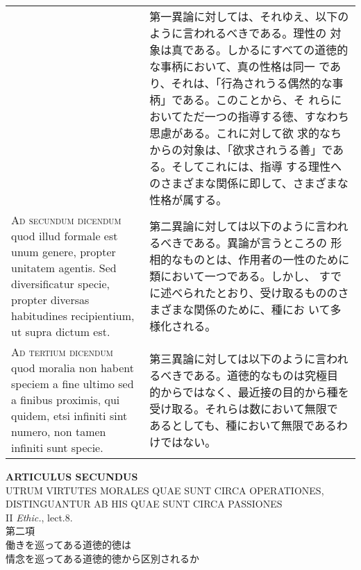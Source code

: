 \documentclass[10pt]{jsarticle}
\begin{document}
\begin{longtable}{p{21em}p{21em}}
&

 第一異論に対しては、それゆえ、以下のように言われるべきである。理性の
 対象は真である。しかるにすべての道徳的な事柄において、真の性格は同一
 であり、それは、「行為されうる偶然的な事柄」である。このことから、そ
 れらにおいてただ一つの指導する徳、すなわち思慮がある。これに対して欲
 求的なちからの対象は、「欲求されうる善」である。そしてこれには、指導
 する理性へのさまざまな関係に即して、さまざまな性格が属する。

\\



{\scshape Ad secundum dicendum} quod illud formale est unum genere,
propter unitatem agentis. Sed diversificatur specie, propter diversas
habitudines recipientium, ut supra dictum est.

&

 第二異論に対しては以下のように言われるべきである。異論が言うところの
 形相的なものとは、作用者の一性のために類において一つである。しかし、
 すでに述べられたとおり、受け取るもののさまざまな関係のために、種にお
 いて多様化される。
 

\\



{\scshape Ad tertium dicendum} quod moralia non habent speciem a fine
ultimo sed a finibus proximis, qui quidem, etsi infiniti sint numero,
non tamen infiniti sunt specie.

&

第三異論に対しては以下のように言われるべきである。道徳的なものは究極目
的からではなく、最近接の目的から種を受け取る。それらは数において無限で
あるとしても、種において無限であるわけではない。


\end{longtable}
\newpage

\begin{center}
{\Large {\bf ARTICULUS SECUNDUS}}\\
{\large UTRUM VIRTUTES MORALES QUAE SUNT CIRCA OPERATIONES,\\DISTINGUANTUR AB HIS QUAE SUNT CIRCA PASSIONES}\\
{\footnotesize II {\itshape Ethic.}, lect.8.}\\
{\Large 第二項\\働きを巡ってある道徳的徳は\\情念を巡ってある道徳的徳から区別されるか}
\end{center}
\end{document}
